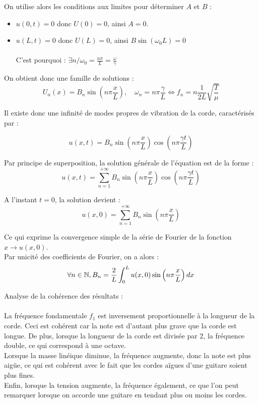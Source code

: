 \documentclass[a4,12pt]{article}
\newcommand{\N}{\mathbb{N}}
\begin{document}
	  On utilise alors les conditions aux limites pour déterminer $A$ et $B$ :\\
	  \begin{itemize}
	    \item $u(0,t) = 0$  donc  $U(0) = 0$, ainsi $A = 0$.\\
	    \item $u(L,t) = 0$  donc  $U(L) = 0$, ainsi $B \sin(\omega_0 L) = 0$\\\\
	      C'est pourquoi :
	      $\exists n / \omega_0 = \frac{n\pi}{L} = \frac{\omega}{\gamma}$\\
	  \end{itemize}

	  On obtient donc une famille de solutions :
	  \[
	    U_n(x)=B_n\sin(n\pi \frac{x}{L}),\quad \omega_n=n\pi \frac{\gamma}{L}\Leftrightarrow f_n=n\frac{1}{2L}\sqrt{\frac{T}{\mu}}
	  \]

	  Il existe donc une infinité de modes propres de vibration de la corde, caractérisés par :

	  \[
	    u(x,t)=B_n\sin\left(n\pi \frac{x}{L}\right) \cos\left(n\pi \frac{\gamma t}{L}\right)
	  \]

	  Par principe de superposition, la solution générale de l'équation est de la forme :
	  \[
	    u(x,t)=\sum_{n=1}^{+\infty}B_n\sin\left(n\pi \frac{x}{L}\right) \cos\left(n\pi \frac{\gamma t}{L}\right)
	  \]

	  A l'instant $t = 0$, la solution devient :
	  \[
	    u(x,0)=\sum_{n=1}^{+\infty}B_n\sin\left(n\pi \frac{x}{L}\right)
	  \]

	  Ce qui exprime la convergence simple de la série de Fourier de la fonction $x \rightarrow u(x,0)$.\\
	  Par unicité des coefficients de Fourier, on a alors :
	  \[ 
	    \forall n \in \N, B_n = {2 \over L} \int_{0}^{L} u(x,0) \sin \left(n \pi {x \over L}\right) dx
	  \]

	  Analyse de la cohérence des résultats :\\\\
	  La fréquence fondamentale $f_1$ est inversement proportionnelle à la longueur de la corde. Ceci est cohérent car la note est d'autant plus grave que la corde est longue. De plus, lorsque la longueur de la corde est divisée par 2, la fréquence double, ce qui correspond à une octave.\\
	  Lorsque la masse linéique diminue, la fréquence augmente, donc la note est plus aigüe, ce qui est cohérent avec le fait que les cordes aïgues d'une guitare soient plus fines.\\
	  Enfin, lorsque la tension augmente, la fréquence également, ce que l'on peut remarquer lorsque on accorde une guitare en tendant plus ou moins les cordes.\\
\end{document}
